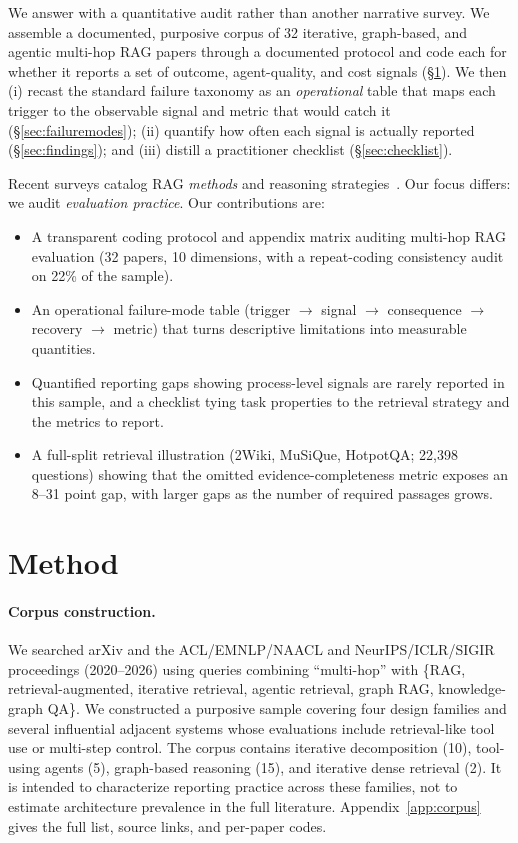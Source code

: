 \documentclass[11pt]{article}
\begin{document}
We answer with a quantitative audit rather than another narrative survey. We assemble a documented,
purposive corpus of 32
iterative, graph-based, and agentic multi-hop RAG papers through a documented protocol and code each
for whether it reports a set of outcome, agent-quality, and cost signals
(\S\ref{sec:method}). We then (i) recast the standard failure taxonomy as an \emph{operational} table
that maps each trigger to the observable signal and metric that would catch it
(\S\ref{sec:failuremodes}); (ii) quantify how often each signal is actually reported
(\S\ref{sec:findings}); and (iii) distill a practitioner checklist
(\S\ref{sec:checklist}).

Recent surveys catalog RAG \emph{methods} and reasoning
strategies~\citep{gao2023survey,rag_reasoning_survey_2025,agentic_rag_survey_2026}. Our focus differs:
we audit \emph{evaluation practice}. Our contributions are:
\begin{itemize}\itemsep0pt
  \item A transparent coding protocol and appendix matrix auditing multi-hop RAG evaluation (32 papers,
  10 dimensions, with a repeat-coding consistency audit on 22\% of the sample).
  \item An operational failure-mode table (trigger $\to$ signal $\to$ consequence $\to$ recovery $\to$
  metric) that turns descriptive limitations into measurable quantities.
  \item Quantified reporting gaps showing process-level signals are rarely reported in this sample, and a
  checklist tying task properties to the retrieval strategy and the metrics to report.
  \item A full-split retrieval illustration (2Wiki, MuSiQue, HotpotQA; 22,398 questions) showing that
  the omitted evidence-completeness metric exposes an 8--31 point gap, with larger gaps as the number
  of required passages grows.
\end{itemize}

\section{Method}
\label{sec:method}
\paragraph{Corpus construction.} We searched arXiv and the ACL/EMNLP/NAACL and NeurIPS/ICLR/SIGIR
proceedings (2020--2026) using queries combining ``multi-hop'' with \{RAG, retrieval-augmented,
iterative retrieval, agentic retrieval, graph RAG, knowledge-graph QA\}. We constructed a purposive
sample covering four design families and several influential adjacent systems whose evaluations
include retrieval-like tool use or multi-step control. The corpus contains iterative decomposition
(10), tool-using agents (5), graph-based reasoning (15), and iterative dense retrieval (2). It is
intended to characterize reporting practice across these families, not to estimate architecture
prevalence in the full literature. Appendix~\ref{app:corpus} gives the full list, source links, and
per-paper codes.
\end{document}
